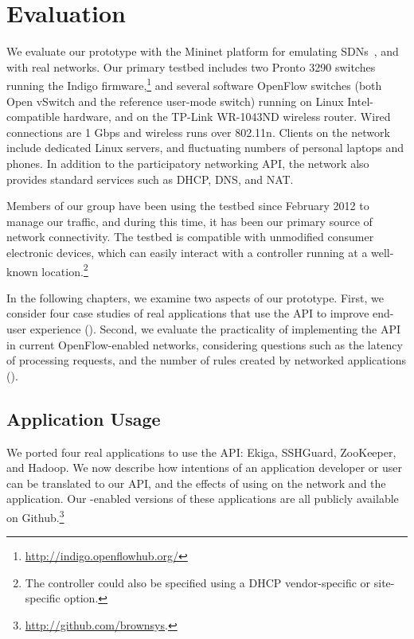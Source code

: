 \chapter{Evaluation}
\label{sec:Evaluation}


We evaluate our \sys prototype with the Mininet platform for
emulating SDNs~\cite{Mininet}, and with real networks. Our primary
testbed includes two Pronto 3290 switches running the Indigo
firmware,\footnote{\scriptsize{\url{http://indigo.openflowhub.org/}}}
and several software OpenFlow switches (both Open vSwitch and the
reference user-mode switch) running
on Linux Intel-compatible
hardware, and on the TP-Link WR-1043ND wireless router.  Wired
connections are 1 Gbps and wireless runs over 802.11n. Clients on
the network include dedicated Linux servers, and fluctuating numbers
of personal laptops and phones. In addition to the participatory
networking API, the network also provides standard services such as
DHCP, DNS, and NAT.

Members of our group have been using the testbed since February 2012
to manage our traffic, and during this time, it has
been our primary source of network connectivity. The testbed is
compatible with unmodified consumer electronic devices, which can
easily interact with a \sys controller running at a well-known
location.\footnote{The \sys controller could also be specified using
a DHCP vendor-specific or site-specific option.}

In the following chapters, we examine two aspects of our prototype.
First, we consider four case studies of real applications
that use the \sys API to improve end-user experience
().  Second, we evaluate the practicality
of implementing the \sys API in current OpenFlow-enabled networks,
considering questions such as the latency of processing requests,
and the number of rules created by networked applications
().

\section{Application Usage}
\label{sec:ApplicationUsage}

We ported four real applications to use the \sys API: Ekiga,
SSHGuard, ZooKeeper, and Hadoop. We now describe how intentions of
an application developer or user can be translated to our API, and
the effects of using \sys on the network and the application. Our
\sys-enabled versions of these applications are all publicly
available on Github.\footnote{\url{http://github.com/brownsys}.}

